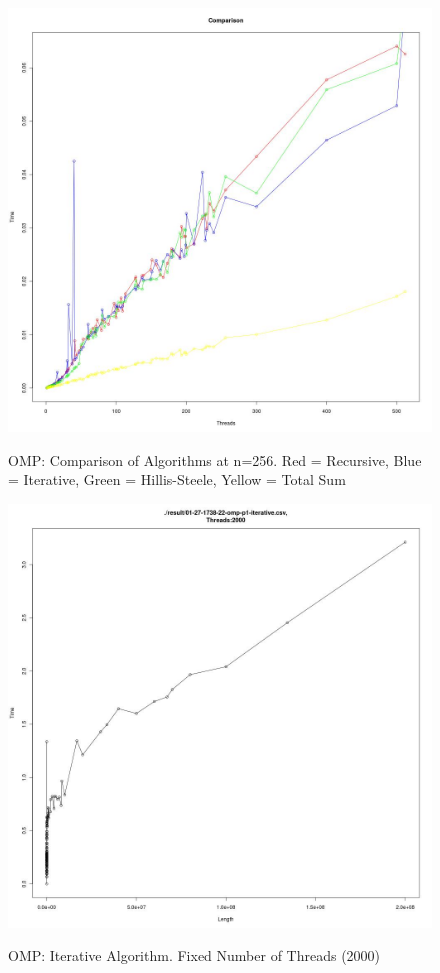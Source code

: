 \documentclass[12pt]{article}
\begin{document}
\begin{figure}[H]
\centering
\caption{OMP: Comparison of Algorithms at n=256. Red = Recursive, Blue = Iterative, 
Green = Hillis-Steele, Yellow = Total Sum}

\includegraphics[scale=0.4]{candidate-graphs/omp_p1_compare_256.jpg}
\label{omp_p1_256}
\end{figure}

\begin{figure}[H]
\centering
\caption{OMP: Iterative Algorithm. Fixed Number of Threads (2000)}

\includegraphics[scale=0.4]{candidate-graphs/omp_p1_iterative_length_2000.jpg}
\label{omp_p1_iterative}
\end{figure}
\end{document}
